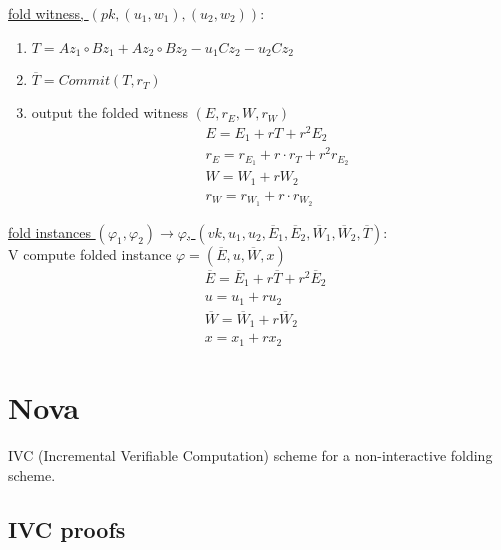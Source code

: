 \documentclass{article}
\theoremstyle{definition}
\begin{document}
\underline{fold witness, $(pk, (u_1, w_1), (u_2, w_2))$}:
\begin{enumerate}
	\item $T=A z_1 \circ B z_1 + A z_2 \circ B z_2 - u_1 C z_2 - u_2 C z_2$
	\item $\overline{T}=Commit(T, r_T)$
	\item output the folded witness $(E, r_E, W, r_W)$
		\begin{align*}
			&E = E_1 + r T + r^2 E_2\\
			&r_E = r_{E_1} + r \cdot r_T + r^2 r_{E_2}\\
			&W=W_1 + r W_2\\
			&r_W = r_{W_1} + r \cdot r_{W_2}
		\end{align*}
\end{enumerate}

\underline{fold instances $(\varphi_1, \varphi_2) \rightarrow \varphi$, $(vk, u_1, u_2, \overline{E}_1, \overline{E}_2, \overline{W}_1, \overline{W}_2, \overline{T})$}:\\
V compute folded instance $\varphi = (\overline{E}, u, \overline{W}, x)$
\begin{align*}
	&\overline{E}=\overline{E}_1 + r \overline{T} + r^2 \overline{E}_2\\
	&u = u_1 + r u_2\\
	&\overline{W} = \overline{W}_1 + r \overline{W}_2\\
	&x = x_1 + r x_2
\end{align*}

\section{Nova}
IVC (Incremental Verifiable Computation) scheme for a non-interactive folding scheme.

\subsection{IVC proofs}
\end{document}
